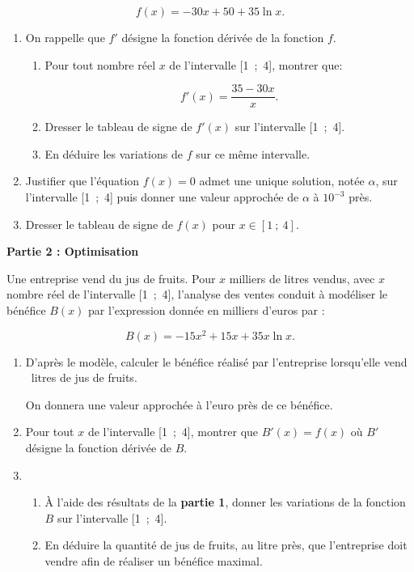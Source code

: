 \documentclass[11pt]{article}
\begin{document}
\[f(x) = - 30x + 50 + 35\ln x.\]

\begin{enumerate}
\item On rappelle que $f'$ désigne la fonction dérivée de la fonction $f$.
	\begin{enumerate}
		\item Pour tout nombre réel $x$ de l'intervalle [1~;~4], montrer que: 
		
\[f'(x) = \dfrac{35- 30x}{x}.\]

		\item Dresser le tableau de signe de $f'(x)$ sur l'intervalle [1~;~4].
		\item En déduire les variations de $f$ sur ce même intervalle.
	\end{enumerate}
\item Justifier que l'équation $f(x) = 0$ admet une unique solution, notée $\alpha$, sur l'intervalle [1~;~4] puis donner une valeur approchée de $\alpha$ à $10^{-3}$ près.
\item  Dresser le tableau de signe de $f(x)$ pour $x \in [1~;~4]$.
\end{enumerate}

\bigskip

\textbf{Partie 2 : Optimisation}

\medskip

Une entreprise vend du jus de fruits. Pour $x$ milliers de litres vendus, avec $x$ nombre réel de l'intervalle [1~;~4], l'analyse des ventes conduit à modéliser le bénéfice $B(x)$ par l'expression donnée en milliers d'euros par :

\[B(x) = - 15x^2 + 15x +35x \ln x.\]

\begin{enumerate}
\item D'après le modèle, calculer le bénéfice réalisé par l'entreprise lorsqu'elle vend ~litres de jus de fruits.

On donnera une valeur approchée à l'euro près de ce bénéfice.
\item Pour tout $x$ de l'intervalle [1~;~4], montrer que $B'(x) = f(x)$ où $B'$ désigne la fonction dérivée de $B$.
\item 
	\begin{enumerate}
		\item À l'aide des résultats de la \textbf{partie 1}, donner les variations de la fonction $B$ sur l'intervalle [1~;~4].
		\item En déduire la quantité de jus de fruits, au litre près, que l'entreprise doit vendre afin de réaliser un bénéfice maximal.
	\end{enumerate}
\end{enumerate}
\end{document}
